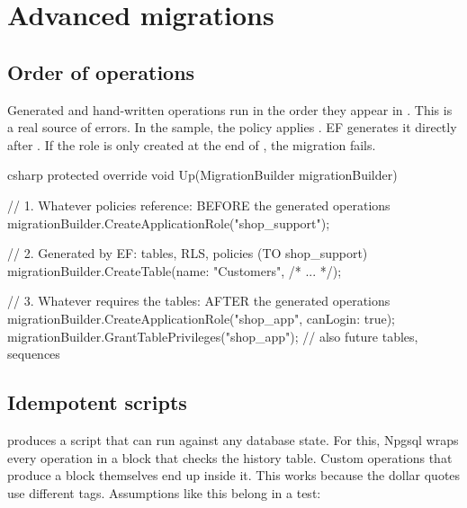 \chapter{Advanced migrations}\label{ch:advanced-migrations}

\section{Order of operations}

Generated and hand-written operations run in the order they appear in
. This is a real source of errors. In the sample, the policy
 applies . EF generates
it directly after . If the role is only created at the end of
, the migration fails.

\begin{sourcecode}{csharp}
protected override void Up(MigrationBuilder migrationBuilder)
{
    // 1. Whatever policies reference: BEFORE the generated operations
    migrationBuilder.CreateApplicationRole("shop_support");

    // 2. Generated by EF: tables, RLS, policies (TO shop_support)
    migrationBuilder.CreateTable(name: "Customers", /* ... */);

    // 3. Whatever requires the tables: AFTER the generated operations
    migrationBuilder.CreateApplicationRole("shop_app", canLogin: true);
    migrationBuilder.GrantTablePrivileges("shop_app");   // also future tables, sequences
}
\end{sourcecode}

\section{Idempotent scripts}

 produces a script that can run against any
database state. For this, Npgsql wraps every operation in a  block that checks the history table.
Custom operations that produce a  block themselves end up inside it. This
works because the dollar quotes use different tags. Assumptions like this belong in a test:

